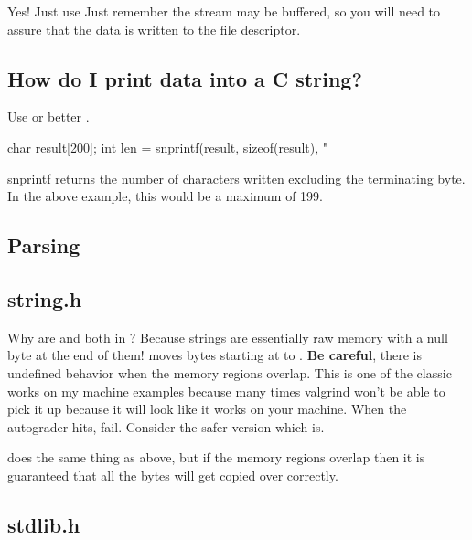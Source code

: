 Yes! Just use 
Just remember the stream may be buffered, so you will need to assure
that the data is written to the file descriptor.

\subsection{How do I print data into a C
string?}\label{how-do-i-print-data-into-a-c-string}

Use  or better .

\begin{code}[language=C]
char result[200];
int len = snprintf(result, sizeof(result), "%
\end{code}

snprintf returns the number of characters written excluding the
terminating byte. In the above example, this would be a maximum of 199.

\subsection{Parsing}

\subsection{string.h}

Why are  and  both in ? Because strings are essentially raw memory with a null byte at the end of them!  moves  bytes starting at  to . \textbf{Be careful}, there is undefined behavior when the memory regions overlap. This is one of the classic works on my machine examples because many times valgrind won't be able to pick it up because it will look like it works on your machine. When the autograder hits, fail. Consider the safer version which is.

does the same thing as above, but if the memory regions overlap then it
is guaranteed that all the bytes will get copied over correctly.

\subsection{stdlib.h}

